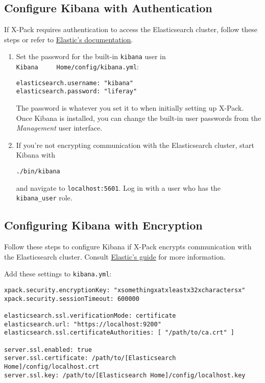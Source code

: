 \subsection{Configure Kibana with
Authentication}\label{configure-kibana-with-authentication}

If X-Pack requires authentication to access the Elasticsearch cluster,
follow these steps or refer to
\href{https://www.elastic.co/guide/en/kibana/6.5/monitoring-xpack-kibana.html}{Elastic's
documentation}.

\begin{enumerate}
\def\labelenumi{\arabic{enumi}.}
\item
  Set the password for the built-in \texttt{kibana} user in
  \texttt{Kibana\ \ \ \ \ Home/config/kibana.yml}:

\begin{verbatim}
elasticsearch.username: "kibana"
elasticsearch.password: "liferay"
\end{verbatim}

  The password is whatever you set it to when initially setting up
  X-Pack. Once Kibana is installed, you can change the built-in user
  passwords from the \emph{Management} user interface.
\item
  If you're not encrypting communication with the Elasticsearch cluster,
  start Kibana with

\begin{verbatim}
./bin/kibana
\end{verbatim}

  and navigate to \texttt{localhost:5601}. Log in with a user who has
  the \texttt{kibana\_user} role.
\end{enumerate}

\subsection{Configuring Kibana with
Encryption}\label{configuring-kibana-with-encryption}

Follow these steps to configure Kibana if X-Pack encrypts communication
with the Elasticsearch cluster. Consult
\href{https://www.elastic.co/guide/en/kibana/6.2/using-kibana-with-security.html\#using-kibana-with-security}{Elastic's
guide} for more information.

Add these settings to \texttt{kibana.yml}:

\begin{verbatim}
xpack.security.encryptionKey: "xsomethingxatxleastx32xcharactersx"
xpack.security.sessionTimeout: 600000

elasticsearch.ssl.verificationMode: certificate
elasticsearch.url: "https://localhost:9200"
elasticsearch.ssl.certificateAuthorities: [ "/path/to/ca.crt" ]

server.ssl.enabled: true
server.ssl.certificate: /path/to/[Elasticsearch Home]/config/localhost.crt
server.ssl.key: /path/to/[Elasticsearch Home]/config/localhost.key
\end{verbatim}

